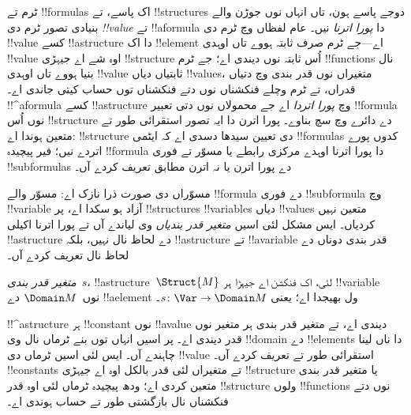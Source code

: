 \documentclass[../../../include/open-logic-section]{subfiles}
\begin{document}


\begin{explain}
ٹرم تے !!{formula}s اک پاسے، تے !!{structure}s دوجے پاسے
ہون، تاں انہاں نوں جوڑن والے بنیادی تصور ٹرم دی \emph{!!{value}}
تے !!a{formula} دا \emph{پورا اترنا} نیں۔ عام لفظاں وچ ٹرم دی
!!{value} کسے !!a{structure} دا اک !!{element} اے---جے ٹرم صرف
ثابتہ ہووے تاں اوہدی !!{value} اوہ شے اے جیہڑی !!{structure}
اُس ثابتہ نوں دیندی اے؛ جے ٹرم !!{function}s نال بنیا ہووے تاں
اوہدی !!{value} ثابتیاں دیاں !!{value}s، متغیراں نوں قدر بندی
وچ دتیاں قدراں، تے ٹرم وچلے فنکشناں نوں دتے فنکشناں توں
حساب کیتی جاندی اے۔
!!^a{formula} کسے
!!a{structure} وچ \emph{پورا اتردا} اے جے محمولاں نوں دتی
تعبیر !!{formula} نوں اُس !!{structure} دے دائرے وچ سچ بناوے۔
پورا اترن دا ایہ تصور استقرائی طور تے متعین ہوندا اے: !!{structure} دی
تعیین سیدھا دسدی اے کہ ایٹمی !!{formula}s کدوں پورے اتردے نیں؛
فیر پیچیدہ !!{formula} دا پورا اترنا اوہدے مرکزی رابطے یا مسوّر
تے فوری !!{subformula}s دے پورا اترن یا نہ اترن مطابق تعریف کردے آں۔

مسوّراں دی صورت ذرا نازک اے: مسوّر والے !!{formula} دے فوری
!!{subformula} وچ !!{variable} آزاد ہو سکدا اے، پر !!{structure}s
!!{variable}s دیاں !!{value}s متعین نہیں کردیاں۔ ایس مشکل لئی
اسیں \emph{متغیر قدر بندیاں} وی لیاندے آں تے پورا اترنا اکیلی
!!a{structure} دے لحاظ نال نہیں، بلکہ !!a{structure} تے
!!a{variable} قدر بندی دوناں دے لحاظ نال تعریف کردے آں۔
\end{explain}

\begin{defn}
\emph{متغیر قدر بندی}~$s$، !!a{structure}~$\Struct{M}$ لئی،
اک فنکشن اے جیہڑا ہر !!{variable} نوں~$\Domain M$ دے
!!a{element} ول بھیجدا اے؛ یعنی $s\colon \Var \to \Domain M$۔
\end{defn}

\begin{explain}
!!^a{structure} ہر !!{constant} نوں !!a{value} دیندی اے،
تے متغیر قدر بندی ہر متغیر نوں قدر دیندی اے۔ پر اسیں انہاں توں
بنے ٹرماں نال وی !!{domain} دے !!{element}s دا ناں لینا چاہندے
آں۔ ایس لئی اسیں ٹرماں دی !!{value} استقرائی طور تے تعریف
کردے آں۔ !!{constant}s تے متغیراں لئی قدر بالکل اوہ اے جیہڑی
!!{structure} یا متغیر قدر بندی متعین کردی اے؛ ودھ پیچیدہ
ٹرماں لئی اوہ قدر !!{structure} ولوں !!{function}s نوں دتے
فنکشناں نال بازگشتی طور تے حساب ہوندی اے۔
\end{explain}
\end{document}
